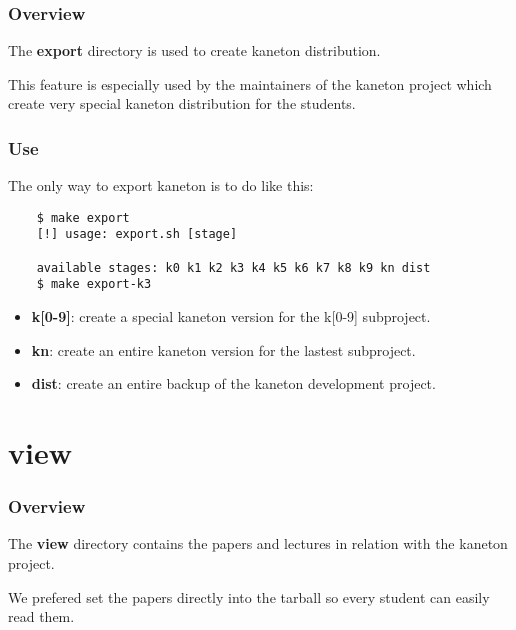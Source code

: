 
\begin{frame}
  \frametitle{Overview}

  The \textbf{export} directory is used to create kaneton distribution.

  \nl

  This feature is especially used by the maintainers of the kaneton
  project which create very special kaneton distribution for
  the students.
\end{frame}


\begin{frame}[containsverbatim]
  \frametitle{Use}

  The only way to export kaneton is to do like this:

  \begin{verbatim}
    $ make export
    [!] usage: export.sh [stage]

    available stages: k0 k1 k2 k3 k4 k5 k6 k7 k8 k9 kn dist
    $ make export-k3
  \end{verbatim}

  \begin{itemize}
    \item
      \textbf{k[0-9]}: create a special kaneton version for the k[0-9]
      subproject.
    \item
      \textbf{kn}: create an entire kaneton version for the lastest
      subproject.
    \item
      \textbf{dist}: create an entire backup of the kaneton development
      project.
  \end{itemize}
\end{frame}

%
%

\section{view}


\begin{frame}
  \frametitle{Overview}

  The \textbf{view} directory contains the papers and lectures
  in relation with the kaneton project.

  \nl

  We prefered set the papers directly into the tarball so every student
  can easily read them.
\end{frame}


